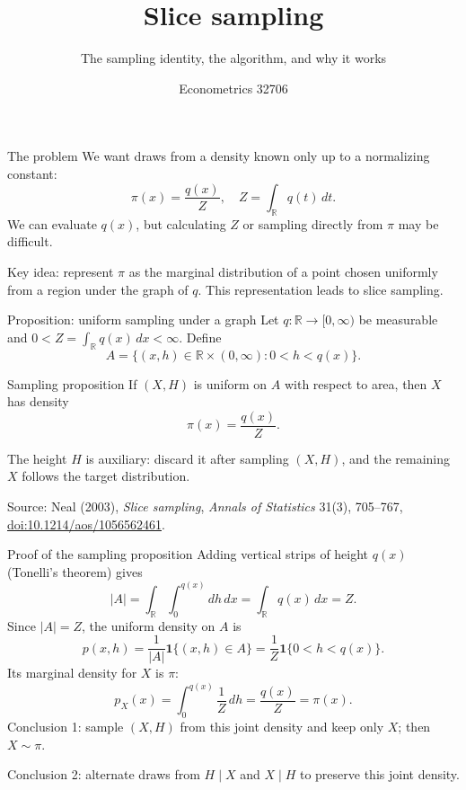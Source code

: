 \documentclass[aspectratio=169,11pt]{beamer}
\title{Slice sampling}
\subtitle{The sampling identity, the algorithm, and why it works}
\author{Econometrics 32706}
\date{}
\begin{document}
\begin{frame}
  \titlepage
\end{frame}

\begin{frame}{The problem}
  We want draws from a density known only up to a normalizing constant:
  \[
    \pi(x)=\frac{q(x)}{Z},\quad Z=\int_{\mathbb R}q(t)\,dt.
  \]
  We can evaluate \(q(x)\), but calculating \(Z\) or sampling
  directly from \(\pi\) may be difficult.
  \vspace{0.7em}

  \alert{Key idea:} represent \(\pi\) as the marginal distribution
  of a point chosen uniformly from a region under the graph of \(q\).
  This representation leads to slice sampling.
\end{frame}

\begin{frame}{Proposition: uniform sampling under a graph}
  Let \(q:\mathbb R\to[0,\infty)\) be measurable and
  \(0<Z=\int_{\mathbb R}q(x)\,dx<\infty\). Define
  \[
    A=\{(x,h)\in\mathbb R\times(0,\infty):0<h<q(x)\}.
  \]
  \begin{block}{Sampling proposition}
    If \((X,H)\) is uniform on \(A\) with respect to area,
    then \(X\) has density
    \[
      \pi(x)=\frac{q(x)}{Z}.
    \]
  \end{block}
  \vspace{0.5em}
  The height \(H\) is auxiliary: discard it after sampling
  \((X,H)\), and the remaining \(X\) follows the target distribution.
  \vspace{0.55em}

  {\tiny Source: Neal (2003), \emph{Slice sampling},
  \emph{Annals of Statistics} 31(3), 705--767,
  \href{https://doi.org/10.1214/aos/1056562461}{doi:10.1214/aos/1056562461}.}
\end{frame}

\begin{frame}{Proof of the sampling proposition}
  Adding vertical strips of height \(q(x)\) (Tonelli's theorem) gives
  \[
    |A|=\int_{\mathbb R}\int_0^{q(x)}dh\,dx
       =\int_{\mathbb R}q(x)\,dx=Z.
  \]
  Since \(|A|=Z\), the uniform density on \(A\) is
  \[
    p(x,h)=\frac{1}{|A|}\mathbf 1\{(x,h)\in A\}
          =\frac{1}{Z}\mathbf 1\{0<h<q(x)\}.
  \]
  Its marginal density for \(X\) is \(\pi\):
  \[
    p_X(x)=\int_0^{q(x)}\frac{1}{Z}\,dh
          =\frac{q(x)}{Z}=\pi(x).
  \]
  \alert{Conclusion 1:} sample \((X,H)\) from this joint density
  and keep only \(X\); then \(X\sim\pi\).
  \vspace{0.25em}

  \alert{Conclusion 2:} alternate draws from \(H\mid X\) and
  \(X\mid H\) to preserve this joint density.
\end{frame}
\end{document}
